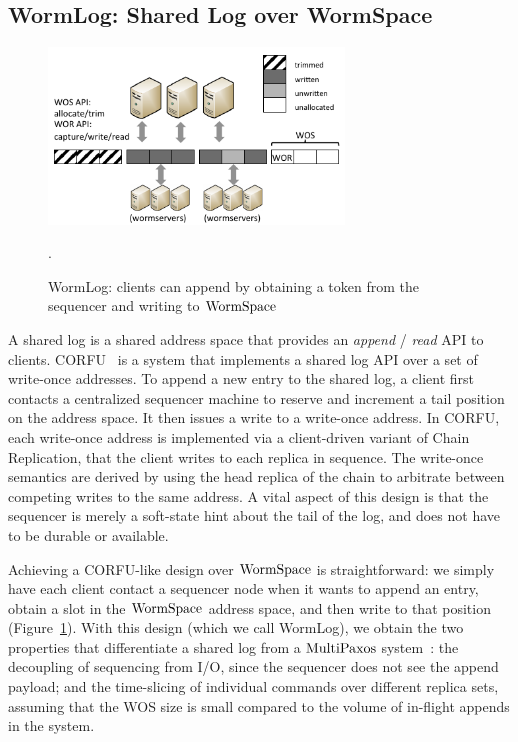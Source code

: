 \subsection{WormLog: Shared Log over WormSpace}
\label{chapter:wormspace:subsec:wormlog}

\begin{figure}
\centering
\includegraphics[width=0.7\textwidth, page=3]{figs/multipaxos/pics.pdf}
\caption{WormLog: clients can append by obtaining a token from the sequencer and writing to $\mathrm{WormSpace}$}
.\label{fig:chapter:multipaxos:wormlogarch}
\end{figure}

A shared log is a shared address space that provides an \textit{append} / \textit{read} API to clients. 
CORFU~\cite{corfu} is a system that implements a shared log API over a set of write-once addresses. 
To append a new entry to the shared log, a client first contacts a centralized sequencer machine to reserve and increment a tail position on the address space. It then issues a write to a write-once address. In CORFU, 
each write-once address is implemented via a client-driven variant of Chain Replication, that the client writes to each replica in sequence. 
The write-once semantics are derived by using the head replica of the chain to arbitrate between competing writes to the same address.
 A vital aspect of this design is that the sequencer is merely a soft-state hint about the tail of the log, and does not have to be durable or available. 

Achieving a CORFU-like design over $\mathrm{WormSpace}$ is straightforward: 
we simply have each client contact a sequencer node when it wants to append an entry, obtain a slot in the $\mathrm{WormSpace}$ address space, 
and then write to that position (Figure~\ref{fig:chapter:multipaxos:wormlogarch}). 
With this design (which we call WormLog), 
we obtain the two properties that differentiate a shared log from a $\mathrm{MultiPaxos}$ system~\cite{corfupaxos}: the decoupling of sequencing 
from I/O, since the sequencer does not see the append payload; and the time-slicing of individual commands over different replica sets, 
assuming that the WOS size is small compared to the volume of in-flight appends in the system.

